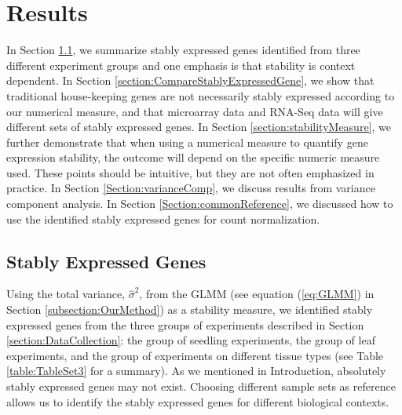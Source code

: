 	
	
	\section{Results} \label{section:Results}
	In Section \ref{section:stablyExpressedGene}, we summarize stably expressed genes identified from three
	different experiment groups and one emphasis is that stability is
	context dependent. In Section \ref{section:CompareStablyExpressedGene}, we show that traditional house-keeping
	genes are not necessarily stably expressed according to our numerical measure, 
	and that microarray data and RNA-Seq data will give different sets of stably
	expressed genes.  In Section \ref{section:stabilityMeasure}, we further demonstrate that when using a
	numerical measure to quantify gene expression stability, the outcome will
	depend on the specific numeric measure used.  These points should be
	intuitive, but they are not often emphasized in practice.  In Section
	\ref{Section:varianceComp}, we discuss results from variance component analysis. In Section
	\ref{Section:commonReference}, we discussed how to use the identified stably
	expressed genes for count normalization.
	
	\subsection{Stably Expressed Genes}\label{section:stablyExpressedGene}
	Using the total variance, $\hat\sigma^2$, from the GLMM (see
	equation (\ref{eq:GLMM}) in Section \ref{subsection:OurMethod}) as a
	stability measure, we identified stably expressed genes from the three groups
	of experiments described in Section \ref{section:DataCollection}: the group of
	seedling experiments, the group of leaf experiments, and the group of
	experiments on different tissue types (see Table \ref{table:TableSet3} for a
	summary).
	As we mentioned in Introduction, absolutely stably expressed genes may not
	exist.  Choosing different sample sets as reference allows us to identify the
	stably expressed genes for different biological contexts.
	
